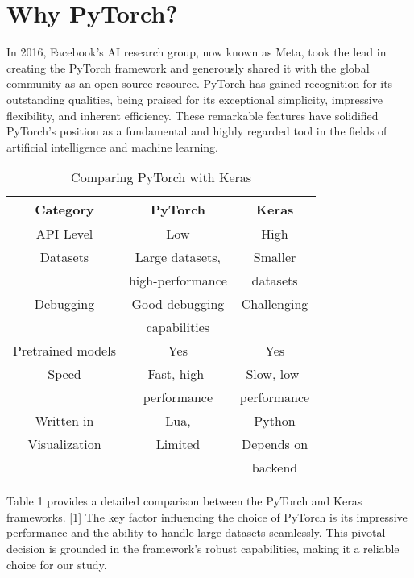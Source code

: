 ﻿\section{Why PyTorch?}
In 2016, Facebook's AI research group, now known as Meta, took the lead in creating the PyTorch framework and generously shared it with the global community as an open-source resource.
PyTorch has gained recognition for its outstanding qualities, being praised for its exceptional simplicity, impressive flexibility, and inherent efficiency.
These remarkable features have solidified PyTorch's position as a fundamental and highly regarded tool in the fields of artificial intelligence and machine learning.

\begin{table}[htp]
    \begin{center}
    \caption{Comparing PyTorch with Keras}
    \label{tab1}
    \small
        \begin{tabular}{| c | c | c |}
            \hline
            Category & PyTorch & Keras \\
            \hline
            API Level & Low & High \\
            \hline
            Datasets & Large datasets, & Smaller \\
             & high-performance & datasets \\
            \hline
            Debugging & Good debugging & Challenging \\
             & capabilities & \\
            \hline
            Pretrained models & Yes & Yes \\
            \hline
            Speed & Fast, high- & Slow, low- \\
             & performance & performance \\
            \hline
            Written in & Lua, & Python \\
            \hline
            Visualization & Limited & Depends on \\
            & & backend \\
            \hline
        \end{tabular}
    \end{center}
\end{table}

Table 1 provides a detailed comparison between the PyTorch and Keras frameworks. [1]
The key factor influencing the choice of PyTorch is its impressive performance and the ability to handle large datasets seamlessly.
This pivotal decision is grounded in the framework's robust capabilities, making it a reliable choice for our study.